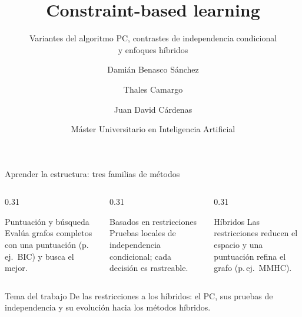 \documentclass[aspectratio=169,11pt]{beamer}
\title[Constraint-based learning]{Constraint-based learning}
\subtitle{Variantes del algoritmo PC, contrastes de independencia condicional\\y enfoques híbridos}
\author[D. Benasco, T. Camargo, J. D. Cárdenas]{%
  Damián Benasco Sánchez \and Thales Camargo \and Juan David Cárdenas}
\institute{Universidad Politécnica de Madrid}
\date{Máster Universitario en Inteligencia Artificial}
\begin{document}
\begin{frame}[plain]
  \titlepage
\end{frame}


\begin{frame}[t]{Aprender la estructura: tres familias de métodos}
  \begin{columns}[T,onlytextwidth]
    \begin{column}{0.31\textwidth}
      \begin{block}{Puntuación y búsqueda}
        Evalúa grafos completos con una puntuación (p.\,ej.\ BIC) y busca el
        mejor.
      \end{block}
    \end{column}
    \begin{column}{0.31\textwidth}
      \begin{alertblock}{Basados en restricciones}
        Pruebas locales de independencia condicional; cada decisión es
        rastreable.
      \end{alertblock}
    \end{column}
    \begin{column}{0.31\textwidth}
      \begin{alertblock}{Híbridos}
        Las restricciones reducen el espacio y una puntuación refina el grafo
        (p.\,ej.\ MMHC).
      \end{alertblock}
    \end{column}
  \end{columns}
  \vspace{0.4cm}
  \begin{exampleblock}{Tema del trabajo}
    De las restricciones a los híbridos: el PC, sus pruebas de independencia
    y su evolución hacia los métodos híbridos.
  \end{exampleblock}
\end{frame}
\end{document}
